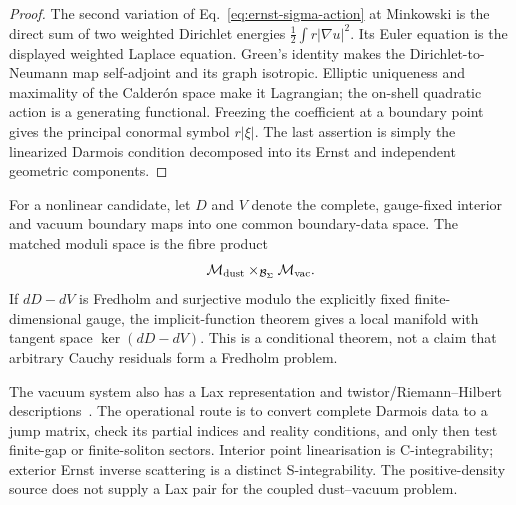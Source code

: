 \begin{proof}
The second variation of Eq.~\eqref{eq:ernst-sigma-action} at Minkowski is
the direct sum of two weighted Dirichlet energies
$\frac12\int r|\nabla u|^2$. Its Euler equation is the displayed weighted
Laplace equation. Green's identity makes the Dirichlet-to-Neumann map
self-adjoint and its graph isotropic. Elliptic uniqueness and maximality of
the Calder\'on space make it Lagrangian; the on-shell quadratic action is a
generating functional. Freezing the coefficient at a boundary point gives
the principal conormal symbol $r|\xi|$. The last assertion is simply the
linearized Darmois condition decomposed into its Ernst and independent
geometric components.
\end{proof}

For a nonlinear candidate, let $D$ and $V$ denote the complete, gauge-fixed
interior and vacuum boundary maps into one common boundary-data space. The
matched moduli space is the fibre product
$$
\mathcal M_{\rm dust}\times_{\mathcal B_\Sigma}\mathcal M_{\rm vac}.
$$
If $dD-dV$ is Fredholm and surjective modulo the explicitly fixed
finite-dimensional gauge, the implicit-function theorem gives a local
manifold with tangent space $\ker(dD-dV)$. This is a conditional theorem,
not a claim that arbitrary Cauchy residuals form a Fredholm problem.

The vacuum system also has a Lax representation and twistor/Riemann--Hilbert
descriptions~\cite{Ernst1968PR,Maison1978PRL,WoodhouseMason1988Nonlinearity}.
The operational route is to convert complete Darmois data to a jump matrix,
check its partial indices and reality conditions, and only then test
finite-gap or finite-soliton sectors. Interior point linearisation is
C-integrability; exterior Ernst inverse scattering is a distinct
S-integrability. The positive-density source does not supply a Lax pair for
the coupled dust--vacuum problem.
